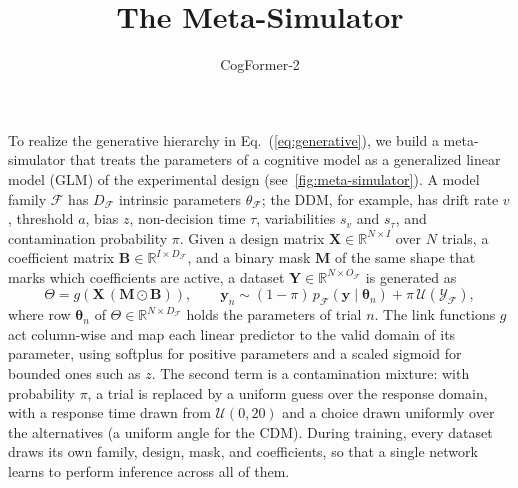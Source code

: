 \documentclass[11pt]{article}
\title{The Meta-Simulator}
\author{CogFormer-2}
\date{}
\newcommand{\rmB}{\mathbf{B}}
\newcommand{\rmX}{\mathbf{X}}
\newcommand{\rmM}{\mathbf{M}}
\newcommand{\rmY}{\mathbf{Y}}
\providecommand{\cref}[1]{Eq.~(\ref{#1})}
\providecommand{\autoref}[1]{\ref{#1}}
\begin{document}
\maketitle


To realize the generative hierarchy in \cref{eq:generative}, we build a meta-simulator that treats the parameters of a cognitive model as a generalized linear model (GLM) of the experimental design (see~\autoref{fig:meta-simulator}). A model family $\mathcal{F}$ has $D_{\mathcal{F}}$ intrinsic parameters $\theta_{\mathcal{F}}$; the DDM, for example, has drift rate $v$, threshold $a$, bias $z$, non-decision time $\tau$, variabilities $s_v$ and $s_\tau$, and contamination probability $\pi$. Given a design matrix $\rmX \in \mathbb{R}^{N \times I}$ over $N$ trials, a coefficient matrix $\rmB \in \mathbb{R}^{I \times D_{\mathcal{F}}}$, and a binary mask $\rmM$ of the same shape that marks which coefficients are active, a dataset $\rmY \in \mathbb{R}^{N \times O_{\mathcal{F}}}$ is generated as
\begin{equation}
\label{eq:meta-simulator}
  \Theta = g\!\left(\rmX\,(\rmM \odot \rmB)\right),
  \qquad
  \bm{y}_n \sim (1 - \pi)\, p_{\mathcal{F}}(\bm{y} \mid \bm{\theta}_n)
              + \pi\, \mathcal{U}(\mathcal{Y}_{\mathcal{F}}),
\end{equation}
where row $\bm{\theta}_n$ of $\Theta \in \mathbb{R}^{N \times D_{\mathcal{F}}}$ holds the parameters of trial $n$. The link functions $g$ act column-wise and map each linear predictor to the valid domain of its parameter, using softplus for positive parameters and a scaled sigmoid for bounded ones such as $z$. The second term is a contamination mixture: with probability $\pi$, a trial is replaced by a uniform guess over the response domain, with a response time drawn from $\mathcal{U}(0, 20)$ and a choice drawn uniformly over the alternatives (a uniform angle for the CDM). During training, every dataset draws its own family, design, mask, and coefficients, so that a single network learns to perform inference across all of them.
\end{document}
